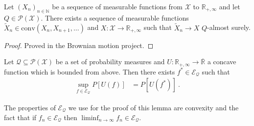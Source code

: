 
\begin{lemma}\label{lem:exists_mem_conv_tendsto}
Let $(X_n)_{n \in \mathbb{N}}$ be a sequence of measurable functions from $\mathcal{X}$ to $\mathbb{R}_{+,\infty}$ and let $Q \in \mathcal{P}(\mathcal{X})$.
There exists a sequence of measurable functions $\tilde{X}_n \in \mathrm{conv}(X_n, X_{n+1}, \ldots)$ and $X : \mathcal{X} \to \mathbb{R}_{+, \infty}$ such that $\tilde{X}_n \to X$ $Q$-almost surely.
\end{lemma}

\begin{proof}
Proved in the Brownian motion project.
\end{proof}


\begin{lemma}\label{lem:exists_integral_utility_eq_sup}
Let $\mathcal{Q} \subseteq \mathcal{P}(\mathcal{X})$ be a set of probability measures and $U : \mathbb{R}_{+,\infty} \to \overline{\mathbb{R}}$ a concave function which is bounded from above.
Then there exists $f^* \in \mathcal{E}_{\mathcal{Q}}$ such that
\begin{align*}
  \sup_{f \in \mathcal{E}_{\mathcal{Q}}} P[U(f)]
  &= P[U(f^*)]
  \: .
\end{align*}
\end{lemma}

The properties of $\mathcal{E}_{\mathcal{Q}}$ we use for the proof of this lemma are convexity and the fact that if $f_n \in \mathcal{E}_{\mathcal{Q}}$ then $\liminf_{n \to \infty} f_n \in \mathcal{E}_{\mathcal{Q}}$.

